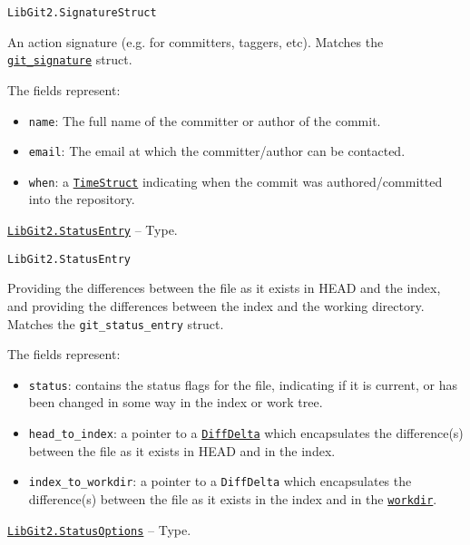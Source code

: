 \begin{adjustwidth}{2em}{0pt}


\begin{verbatim}
LibGit2.SignatureStruct
\end{verbatim}

An action signature (e.g. for committers, taggers, etc). Matches the \href{https://libgit2.org/libgit2/\#HEAD/type/git\_signature}{\texttt{git\_signature}} struct.

The fields represent:

\begin{itemize}
\item \texttt{name}: The full name of the committer or author of the commit.


\item \texttt{email}: The email at which the committer/author can be contacted.


\item \texttt{when}: a \hyperlink{11932909532186040994}{\texttt{TimeStruct}} indicating when the commit was  authored/committed into the repository.

\end{itemize}


\end{adjustwidth}
\hypertarget{16035791715224568905}{}
\hyperlink{16035791715224568905}{\texttt{LibGit2.StatusEntry}}  -- {Type.}

\begin{adjustwidth}{2em}{0pt}


\begin{verbatim}
LibGit2.StatusEntry
\end{verbatim}

Providing the differences between the file as it exists in HEAD and the index, and providing the differences between the index and the working directory. Matches the \texttt{git\_status\_entry} struct.

The fields represent:

\begin{itemize}
\item \texttt{status}: contains the status flags for the file, indicating if it is current, or has been changed in some way in the index or work tree.


\item \texttt{head\_to\_index}: a pointer to a \hyperlink{9789233943804285928}{\texttt{DiffDelta}} which encapsulates the difference(s) between the file as it exists in HEAD and in the index.


\item \texttt{index\_to\_workdir}: a pointer to a \texttt{DiffDelta} which encapsulates the difference(s) between the file as it exists in the index and in the \hyperlink{6689577338311178757}{\texttt{workdir}}.

\end{itemize}


\end{adjustwidth}
\hypertarget{15761804013497693135}{}
\hyperlink{15761804013497693135}{\texttt{LibGit2.StatusOptions}}  -- {Type.}

